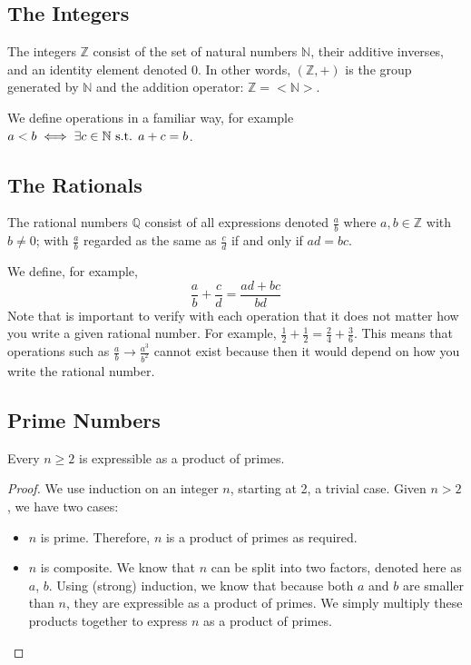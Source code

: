 \documentclass{article}
\begin{document}
	\subsection{The Integers}
	The integers $\mathbb Z$ consist of the set of natural numbers $\mathbb N$, their additive inverses, and an identity element denoted 0. In other words, $(\mathbb Z, +)$ is the group generated by $\mathbb N$ and the addition operator: $\mathbb Z = <\mathbb N>$.
	
	We define operations in a familiar way, for example $a < b \iff \exists c \in \mathbb N \text{ s.t. } a+c = b$.
	
	\subsection{The Rationals}
	The rational numbers $\mathbb Q$ consist of all expressions denoted $\frac{a}{b}$ where $a, b \in \mathbb Z$ with $b \neq 0$; with $\frac{a}{b}$ regarded as the same as $\frac{c}{d}$ if and only if $ad=bc$.
	
	We define, for example,
	\[ \frac{a}{b} + \frac{c}{d} = \frac{ad + bc}{bd} \]
	Note that is important to verify with each operation that it does not matter how you write a given rational number. For example, $\frac{1}{2} + \frac{1}{2} = \frac{2}{4} + \frac{3}{6}$. This means that operations such as $\frac{a}{b} \to \frac{a^3}{b^2}$ cannot exist because then it would depend on how you write the rational number.
	
	\subsection{Prime Numbers}
	\begin{proposition}
		Every $n \geq 2$ is expressible as a product of primes.
	\end{proposition}
	\begin{proof}
		We use induction on an integer $n$, starting at 2, a trivial case. Given $n > 2$, we have two cases:
		\begin{itemize}
			\item $n$ is prime. Therefore, $n$ is a product of primes as required.
			\item $n$ is composite. We know that $n$ can be split into two factors, denoted here as $a$, $b$. Using (strong) induction, we know that because both $a$ and $b$ are smaller than $n$, they are expressible as a product of primes. We simply multiply these products together to express $n$ as a product of primes.
		\end{itemize}
	\end{proof}
\end{document}
